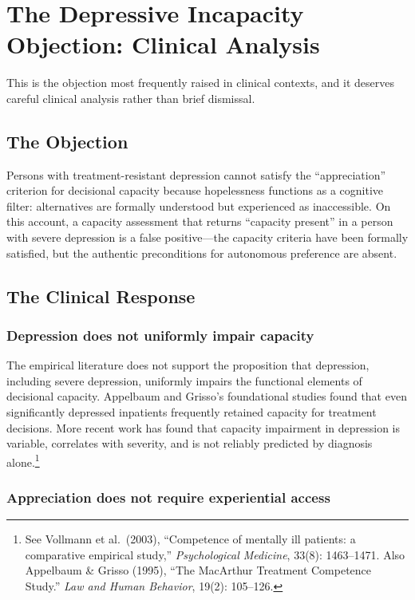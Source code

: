 \documentclass[11pt, letterpaper]{article}
\begin{document}
\section{The Depressive Incapacity Objection: Clinical Analysis}

This is the objection most frequently raised in clinical contexts, and it deserves
careful clinical analysis rather than brief dismissal.

\subsection{The Objection}

Persons with treatment-resistant depression cannot satisfy the ``appreciation'' criterion
for decisional capacity because hopelessness functions as a cognitive filter: alternatives
are formally understood but experienced as inaccessible. On this account, a capacity
assessment that returns ``capacity present'' in a person with severe depression is a
false positive---the capacity criteria have been formally satisfied, but the authentic
preconditions for autonomous preference are absent.

\subsection{The Clinical Response}

\subsubsection{Depression does not uniformly impair capacity}

The empirical literature does not support the proposition that depression, including
severe depression, uniformly impairs the functional elements of decisional capacity.
Appelbaum and Grisso's foundational studies found that even significantly depressed
inpatients frequently retained capacity for treatment decisions. More recent work has
found that capacity impairment in depression is variable, correlates with severity,
and is not reliably predicted by diagnosis alone.\footnote{%
  See Vollmann et al.\ (2003), ``Competence of mentally ill patients: a comparative
  empirical study,'' \textit{Psychological Medicine}, 33(8): 1463--1471. Also
  Appelbaum \& Grisso (1995), ``The MacArthur Treatment Competence Study.''
  \textit{Law and Human Behavior}, 19(2): 105--126.}

\subsubsection{Appreciation does not require experiential access}
\end{document}
